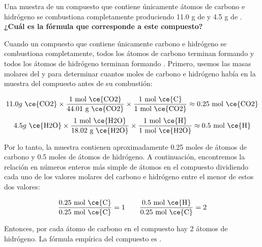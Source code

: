 Una muestra de un compuesto que contiene únicamente átomos de carbono e hidrógeno se combustiona completamente produciendo 11.0 g de  y 4.5 g de .
\textbf{¿Cuál es la fórmula que corresponde a este compuesto?}

\begin{oneparchoices}
    \choice  {}
    \CorrectChoice  {}
    \choice  {}
    \choice  {}
\end{oneparchoices}

\begin{solutionbox}{8cm}
    Cuando un compuesto que contiene únicamente carbono e hidrógeno se combustiona completamente, todos los átomos de carbono terminan formando  y todos los átomos de hidrógeno terminan formando .
    Primero, usemos las masas molares del  y  para determinar cuantos moles de carbono e hidrógeno había en la muestra del compuesto antes de su combustión:
    
    \[ 11.0 g \text{ \ce{CO2}} \times \frac{1 \text{ mol \ce{CO2}}}{44.01 \text{ g \ce{CO2}}} \times \dfrac{ 1 \text{ mol \ce{C}}}{1 \text{ mol \ce{CO2}}} \approx 0.25 \text{ mol \ce{CO2}}  \] 
    \[ 4.5 g \text{ \ce{H2O}} \times \frac{1 \text{ mol \ce{H2O}}}{18.02 \text{ g \ce{H2O}}}  \times \dfrac{ 1 \text{ mol \ce{H}}}{1 \text{ mol \ce{H2O}}} \approx 0.5 \text{ mol \ce{H}} \]
    
    Por lo tanto, la muestra contienen aproximadamente 0.25 moles de átomos de carbono y 0.5 moles de átomos de hidrógeno.
    A continuación, encontremos la relación en números enteros más simple de átomos en el compuesto dividiendo cada uno de los valores molares del carbono e hidrógeno entre el menor de estos dos valores:
    
    \[ \frac{0.25 \text{ mol \ce{C}}}{0.25 \text{ mol \ce{C}}} = 1 \qquad \frac{0.5 \text{ mol \ce{H}}}{0.25 \text{ mol \ce{C}}} = 2 \]
    
    Entonces, por cada átomo de carbono en el compuesto hay 2 átomos de hidrógeno.
    La fórmula empírica del compuesto es .
\end{solutionbox}